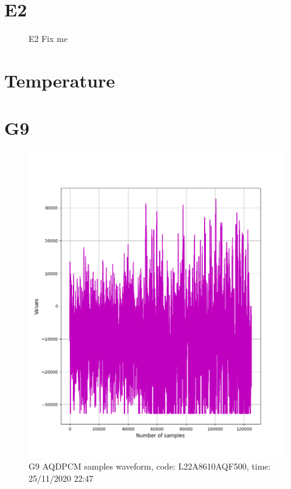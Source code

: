 \documentclass[hidelinks, 12pt, a4paper]{article}
\begin{document}
\section{E2}

\begin{figure}[h!]
\centering
	\caption{E2 Fix me} 
\end{figure}

\section{Temperature}



\section{G9}

\begin{figure}[h!]
\centering
	\includegraphics[height=.4\textheight, width=\textwidth]{assets/session1/g9_aq.png}
	\caption{G9 AQDPCM samples waveform, code: L22A8610AQF500, time: 25/11/2020 22:47} 
\end{figure}
\end{document}
